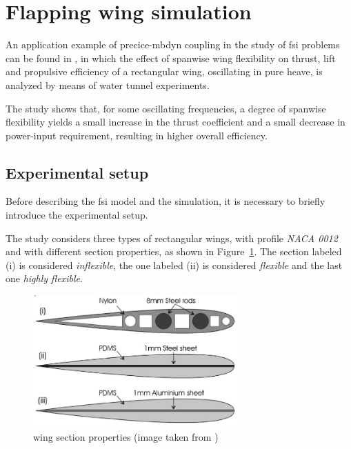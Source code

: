 
\section{Flapping wing simulation}
\label{sec:heathcote}

An application example of \acrshort{precice}-\acrshort{mbdyn} coupling in the study of \acrshort{fsi} problems can be found in \cite{heathcote2008effect}, in which the effect of spanwise wing flexibility on thrust, lift and propulsive efficiency of a rectangular wing, oscillating in pure heave, is analyzed by means of water tunnel experiments.

The study shows that, for some oscillating frequencies, a degree of spanwise flexibility yields a small
increase in the thrust coefficient and a small decrease in power-input requirement, resulting in higher overall efficiency.

\subsection{Experimental setup}

Before describing the \acrshort{fsi} model and the simulation, it is necessary to briefly introduce the experimental setup.

The study considers three types of rectangular wings, with profile \textit{NACA 0012} and with different section properties, as shown in Figure~\ref{fig:profiles0012}. The section labeled (i) is considered \textit{inflexible}, the one labeled (ii) is considered \textit{flexible} and the last one \textit{highly flexible}.

\begin{figure}[htbp!]
	\centering
	\includegraphics[width=0.7\textwidth]{images/profiles0012}
	\caption{wing section properties (image taken from \cite{heathcote2008effect})}
	\label{fig:profiles0012}
\end{figure}

